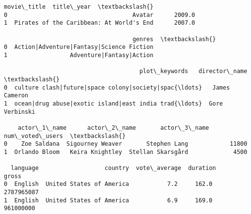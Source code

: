             \begin{tcolorbox}[breakable, size=fbox, boxrule=.5pt, pad at break*=1mm, opacityfill=0]
\begin{Verbatim}[commandchars=\\\{\}]
                                movie\_title  title\_year  \textbackslash{}
0                                    Avatar      2009.0
1  Pirates of the Caribbean: At World's End      2007.0

                                     genres  \textbackslash{}
0  Action|Adventure|Fantasy|Science Fiction
1                  Adventure|Fantasy|Action

                                       plot\_keywords   director\_name  \textbackslash{}
0  culture clash|future|space colony|society|spac{\ldots}   James Cameron
1  ocean|drug abuse|exotic island|east india trad{\ldots}  Gore Verbinski

    actor\_1\_name      actor\_2\_name       actor\_3\_name  num\_voted\_users  \textbackslash{}
0    Zoe Saldana  Sigourney Weaver       Stephen Lang            11800
1  Orlando Bloom   Keira Knightley  Stellan Skarsgård             4500

  language                   country  vote\_average  duration       gross
0  English  United States of America           7.2     162.0  2787965087
1  English  United States of America           6.9     169.0   961000000
\end{Verbatim}
\end{tcolorbox}
        
